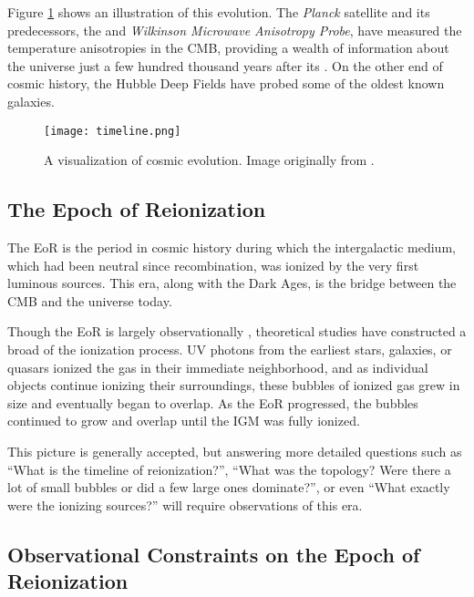 \documentclass[12pt]{article}
\begin{document}
Figure \ref{fig:timeline} shows an illustration of this evolution. The \textit{Planck} satellite and its predecessors, the  and \textit{Wilkinson Microwave Anisotropy Probe}, have measured the temperature anisotropies in the CMB, providing a wealth of information about the universe just a few hundred thousand years after its . On the other end of cosmic history, the Hubble Deep Fields have probed some of the oldest known galaxies. 

\begin{figure}[tb]
	\centering
	\texttt{[image: timeline.png]}
	\caption[History of the universe]{A visualization of cosmic evolution. Image originally from \cite{loeb2006}.}
	\label{fig:timeline}
\end{figure}

\subsection{The Epoch of Reionization} \label{subsec:eor}

The EoR is the period in cosmic history during which the intergalactic medium, which had been neutral since recombination, was ionized by the very first luminous sources. This era, along with the Dark Ages, is the bridge between  the CMB and the universe today.

Though the EoR is largely observationally , theoretical studies have constructed a broad  of the ionization process. UV photons from the earliest stars, galaxies, or quasars ionized the gas in their immediate neighborhood, and as individual objects continue ionizing their surroundings, these bubbles of ionized gas grew in size and eventually began to overlap. As the EoR progressed, the bubbles continued to grow and overlap until the IGM was fully ionized.

This  picture is generally accepted, but answering more detailed questions such as ``What is the timeline of reionization?'', ``What was the topology? Were there a lot of small bubbles or did a few large ones dominate?'', or even ``What exactly were the ionizing sources?''  will require observations of this era.

\subsection{Observational Constraints on the Epoch of Reionization} \label{subsec:probes}
\end{document}
